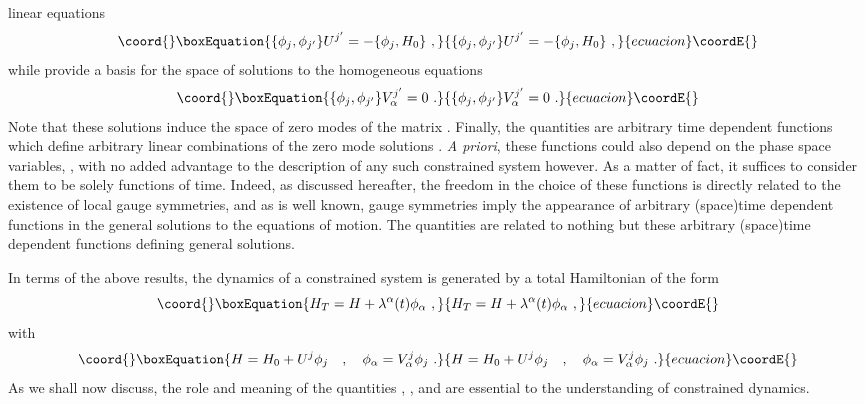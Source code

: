 \documentclass[a4paper,11pt]{article}
\begin{document}
linear equations
\begin{equation}\coord{}\boxEquation{
\{\phi_j,\phi_{j'}\}U^{j'}=-\{\phi_j,H_0\}\ ,
}{
\{\phi_j,\phi_{j'}\}U^{j'}=-\{\phi_j,H_0\}\ ,
}{ecuacion}\coordE{}\end{equation}
while \coordHE{} provide a basis for the space of solutions to
the homogeneous equations
\begin{equation}\coord{}\boxEquation{
\{\phi_j,\phi_{j'}\}V^{j'}_\alpha=0\ .
}{
\{\phi_j,\phi_{j'}\}V^{j'}_\alpha=0\ .
}{ecuacion}\coordE{}\end{equation}
Note that these solutions induce the space of zero modes of the matrix
\coordHE{}. Finally, the quantities \coordHE{} are
arbitrary time dependent functions which define arbitrary linear combinations
of the zero mode solutions \coordHE{}. {\sl A priori\/}, these functions
could also depend on the phase space variables, \coordHE{},
with no added advantage to the description of any such constrained
system however. As a matter of fact, it suffices to consider them to be
solely functions of time. Indeed, as discussed hereafter, the freedom in the
choice of these functions is directly related to the existence of local
gauge symmetries, and as is well known, gauge symmetries imply the
appearance of arbitrary (space)time dependent functions in the general
solutions to the equations of motion. The quantities \coordHE{}
are related to nothing but these arbitrary (space)time dependent functions 
defining general solutions.

In terms of the above results, the dynamics of a constrained system is
generated by a total Hamiltonian of the form
\begin{equation}\coord{}\boxEquation{
H_T=H+\lambda^\alpha(t)\phi_\alpha\ ,
}{
H_T=H+\lambda^\alpha(t)\phi_\alpha\ ,
}{ecuacion}\coordE{}\end{equation}
with
\begin{equation}\coord{}\boxEquation{
H=H_0+U^j\phi_j\ \ \ ,\ \ \ 
\phi_\alpha=V^j_\alpha\phi_j\ .
}{
H=H_0+U^j\phi_j\ \ \ ,\ \ \ 
\phi_\alpha=V^j_\alpha\phi_j\ .
}{ecuacion}\coordE{}\end{equation}
As we shall now discuss, the role and meaning of the quantities \coordHE{},
\myHighlight{$H$}\coordHE{}, \myHighlight{$\phi_\alpha$}\coordHE{} and \myHighlight{$\lambda^\alpha$}\coordHE{} are essential to the understanding
of constrained dynamics.
\end{document}
